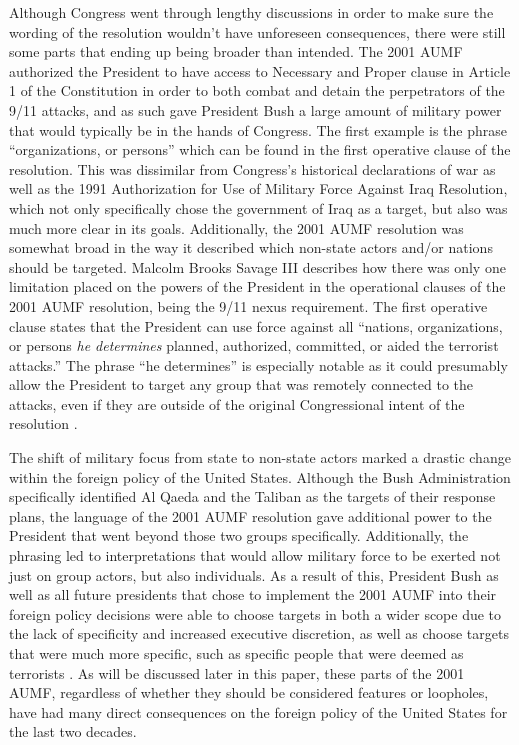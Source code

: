 \documentclass[12pt]{article}
\begin{document}
Although Congress went through lengthy discussions in order to make sure the wording of the resolution wouldn't have unforeseen consequences, there were still some parts that ending up being broader than intended.
The 2001 AUMF authorized the President to have access to Necessary and Proper clause in Article 1 of the Constitution in order to both combat and detain the perpetrators of the 9/11 attacks, and as such gave President Bush a large amount of military power that would typically be in the hands of Congress.
The first example is the phrase ``organizations, or persons'' which can be found in the first operative clause of the resolution.
This was dissimilar from Congress's historical declarations of war as well as the 1991 Authorization for Use of Military Force Against Iraq Resolution, which not only specifically chose the government of Iraq as a target, but also was much more clear in its goals.
Additionally, the 2001 AUMF resolution was somewhat broad in the way it described which non-state actors and/or nations should be targeted.
Malcolm Brooks Savage III describes how there was only one limitation placed on the powers of the President in the operational clauses of the 2001 AUMF resolution, being the 9/11 nexus requirement.
The first operative clause states that the President can use force against all ``nations, organizations, or persons \emph{he determines} planned, authorized, committed, or aided the terrorist attacks.''
The phrase ``he determines'' is especially notable as it could presumably allow the President to target any group that was remotely connected to the attacks, even if they are outside of the original Congressional intent of the resolution \autocite[5]{savage2015}.

The shift of military focus from state to non-state actors marked a drastic change within the foreign policy of the United States.
Although the Bush Administration specifically identified Al Qaeda and the Taliban as the targets of their response plans, the language of the 2001 AUMF resolution gave additional power to the President that went beyond those two groups specifically.
Additionally, the phrasing led to interpretations that would allow military force to be exerted not just on group actors, but also individuals.
As a result of this, President Bush as well as all future presidents that chose to implement the 2001 AUMF into their foreign policy decisions were able to choose targets in both a wider scope due to the lack of specificity and increased executive discretion, as well as choose targets that were much more specific, such as specific people that were deemed as terrorists \autocite[3]{weed2015}.
As will be discussed later in this paper, these parts of the 2001 AUMF, regardless of whether they should be considered features or loopholes, have had many direct consequences on the foreign policy of the United States for the last two decades.
\end{document}
